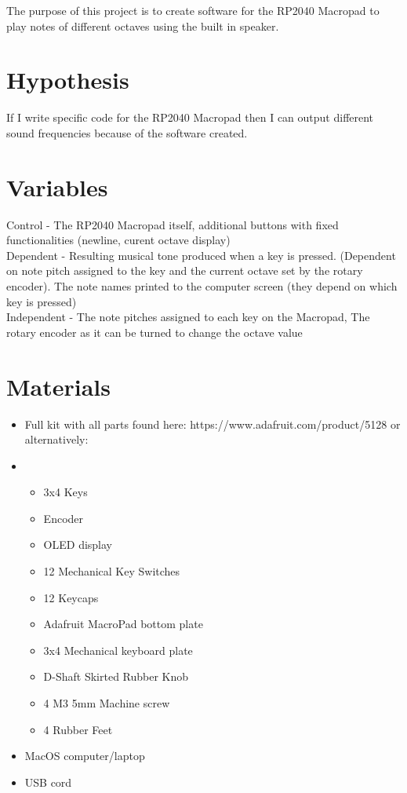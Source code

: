 \documentclass{article}
\begin{document}
The purpose of this project is to create software for the RP2040 Macropad to play notes of different octaves using the built in speaker. 

\section{Hypothesis}

If I write specific code for the RP2040 Macropad then I can output different sound frequencies because of the software created.

\section{Variables}

Control - The RP2040 Macropad itself, additional buttons with fixed functionalities (newline, curent octave display) \\
Dependent - Resulting musical tone produced when a key is pressed. (Dependent on note pitch assigned to the key and the current octave set by the rotary encoder). The note names printed to the computer screen (they depend on which key is pressed)\\
Independent - The note pitches assigned to each key on the Macropad, The rotary encoder as it can be turned to change the octave value

\section{Materials}

\begin{itemize}
    \item Full kit with all parts found here: https://www.adafruit.com/product/5128 or alternatively:
    \item
        \begin{itemize}
            \item 3x4 Keys
            \item Encoder
            \item OLED display
            \item 12 Mechanical Key Switches
            \item 12 Keycaps
            \item Adafruit MacroPad bottom plate
            \item 3x4 Mechanical keyboard plate
            \item D-Shaft Skirted Rubber Knob
            \item 4 M3 5mm Machine screw
            \item 4 Rubber Feet
        \end{itemize}
    \item MacOS computer/laptop
    \item USB cord
\end{itemize}
\end{document}
